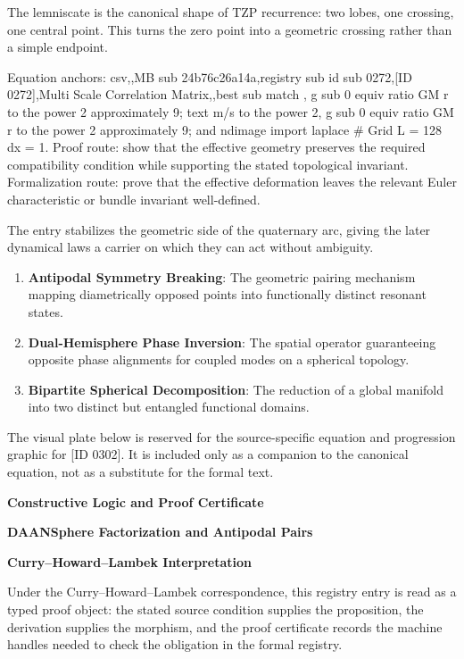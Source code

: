 The lemniscate is the canonical shape of TZP recurrence: two lobes, one crossing, one central point. This turns the zero point into a geometric crossing rather than a simple endpoint.

Equation anchors: csv,,MB sub 24b76c26a14a,registry sub id sub 0272,[ID 0272],Multi Scale Correlation Matrix,,best sub match , g sub 0 equiv ratio GM r to the power 2 approximately 9; text m/s to the power 2, g sub 0 equiv ratio GM r to the power 2 approximately 9; and ndimage import laplace \# Grid L = 128 dx = 1. Proof route: show that the effective geometry preserves the required compatibility condition while supporting the stated topological invariant. Formalization route: prove that the effective deformation leaves the relevant Euler characteristic or bundle invariant well-defined.

The entry stabilizes the geometric side of the quaternary arc, giving the later dynamical laws a carrier on which they can act without ambiguity.
\endgroup

\begin{enumerate}[leftmargin=1.6em,itemsep=6pt,topsep=4pt]
\item \textbf{Antipodal Symmetry Breaking}: The geometric pairing mechanism mapping diametrically opposed points into functionally distinct resonant states.
\item \textbf{Dual-Hemisphere Phase Inversion}: The spatial operator guaranteeing opposite phase alignments for coupled modes on a spherical topology.
\item \textbf{Bipartite Spherical Decomposition}: The reduction of a global manifold into two distinct but entangled functional domains.
\end{enumerate}

\begingroup\footnotesize\sloppy
The visual plate below is reserved for the source-specific equation and progression graphic for [ID 0302]. It is included only as a companion to the canonical equation, not as a substitute for the formal text.
\par\endgroup
\ifTZPDarkEdition
{}
\fi

\clearpage
\begingroup\tzpsupportsetup
\noindent\textbf{\fontsize{10.8pt}{12.8pt}\selectfont [ID 0302] Constructive Logic and Proof Certificate}\par
\noindent\textbf{\fontsize{10pt}{12pt}\selectfont DAANSphere Factorization and Antipodal Pairs}\par
\vspace{0.45em}
\begingroup
\footnotesize
\setlength{\parskip}{0.22em}
\setlength{\parindent}{0pt}
\noindent\textbf{Curry--Howard--Lambek Interpretation}\par
Under the Curry--Howard--Lambek correspondence, this registry entry is read as a typed proof
object: the stated source condition supplies the proposition, the derivation supplies the
morphism, and the proof certificate records the machine handles needed to check the obligation
in the formal registry.


